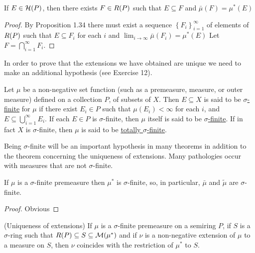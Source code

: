 \begin{corollary}
If $E \in {\cal H}(P)$, then there exists $F \in R(P)$ such that $E \subseteq F$ and $\bar{\mu}(F)=\mu^*(E)$
\end{corollary}
\begin{proof}
By Proposition 1.34 there must exist a sequence $\left\{{F}_i\right\}_{i=1}^\infty$ of elements of $R(P)$ such that $E \subseteq F_i$ for each $i$ and $\lim _{i \to \infty} \bar{\mu}\left(F_i\right)=\mu^*(E)$ Let $F=\bigcap_{i=1}^\infty F_i$.
\end{proof}

In order to prove that the extensions we have obtained are unique we need to make an additional hypothesis (see Exercise 12).

\begin{definition}
Let $\mu$ be a non-negative set function (such as a premeasure, measure, or outer measure) defined on a collection $P$, of subsets of $X$. Then $E \subseteq X$ is said to be \underline{$\sigma$-finite} for $\mu$ if there exist $E_i \in P$ such that $\mu\left(E_i\right)<\infty$ for each $i$, and $E \subseteq \bigcup_{i=1}^\infty E_i$. If each $E \in P$ is $\sigma$-finite, then $\mu$ itself is said to be \underline{$\sigma$-finite}. If in fact $X$ is $\sigma$-finite, then $\mu$ is said to be \underline{totally $\sigma$-finite}.
\end{definition}

Being $\sigma$-finite will be an important hypothesis in many theorems in addition to the theorem concerning the uniqueness of extensions. Many pathologies occur with measures that are not $\sigma$-finite.

\begin{proposition}
If $\mu$ is a $\sigma$-finite premeasure then $\mu^*$ is $\sigma$-finite, so, in particular, $\bar{\mu}$ and $\tilde{\mu}$ are $\sigma$-finite.
\end{proposition}
\begin{proof}
Obvious
\end{proof}

\begin{theorem}(Uniqueness of extensions) If $\mu$ is a $\sigma$-finite premeasure on a semiring $P$, if $S$ is a $\sigma$-ring such that $R(P) \subseteq S \subseteq {\cal M}(\mu^*)$ and if $\nu$ is a non-negative extension of $\mu$ to a measure on ${S}$, then $\nu$ coincides with the restriction of $\mu^*$ to ${S}$.
\end{theorem}

